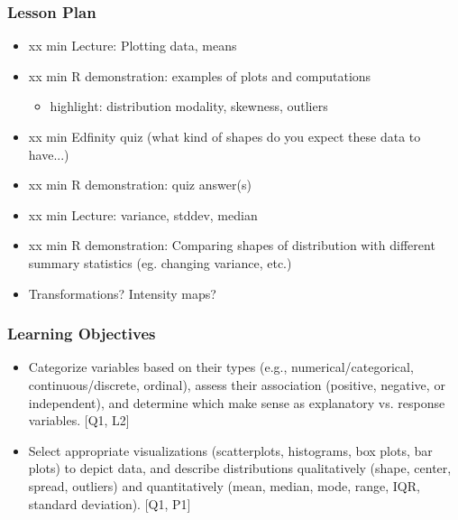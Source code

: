 \begin{frame}
    \frametitle{Lesson Plan}
    \begin{itemize}
        \item xx min Lecture: Plotting data, means
        \item xx min R demonstration: examples of plots and computations
        \begin{itemize}
            \item  highlight: distribution modality, skewness, outliers
        \end{itemize}
        \item xx min Edfinity quiz (what kind of shapes do you expect these data to have...)
        \item xx min R demonstration: quiz answer(s)
        \item xx min Lecture: variance, stddev, median
        \item xx min R demonstration: Comparing shapes of distribution with different summary statistics (eg. changing variance, etc.)
        \item Transformations? Intensity maps?
    \end{itemize}
\end{frame}

\begin{frame}
    \frametitle{Learning Objectives}
    \begin{itemize}
        \item Categorize variables based on their types (e.g., numerical/categorical, continuous/discrete, ordinal), assess their association (positive, negative, or independent), and determine which make sense as explanatory vs. response variables. [Q1, L2]
        \item Select appropriate visualizations (scatterplots, histograms, box plots, bar plots) to depict data, and describe distributions qualitatively (shape, center, spread, outliers) and quantitatively (mean, median, mode, range, IQR, standard deviation). [Q1, P1] 
    \end{itemize}
\end{frame}